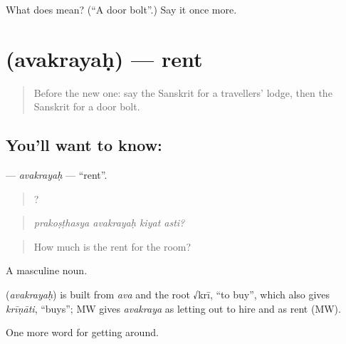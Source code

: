 \begin{tcolorbox}[breakable,colback=teal!4,colframe=teal!35!black,title={Before you move on}]
What does  mean? (\textquotedblleft{}A door bolt\textquotedblright{}.) Say it once more.
\end{tcolorbox}
\section[\texorpdfstring{\sk{अवक्रयः} (avakrayaḥ)}{अवक्रयः (avakrayaḥ)}]{ (avakrayaḥ) — rent}

\label{lesson:SA-C429-avakrayah}



\begin{quote}
Before the new one: say the Sanskrit for a travellers' lodge, then the Sanskrit for a door bolt.
\end{quote}

\subsection*{You'll want to know: }
\textbf{} — \emph{avakrayaḥ} — \textquotedblleft{}rent\textquotedblright{}.

\begin{quote}
   ?
\end{quote}

\begin{quote}
\emph{prakoṣṭhasya avakrayaḥ kiyat asti?}
\end{quote}

\begin{quote}
How much is the rent for the room?
\end{quote}

A masculine noun.

\begin{cousinweb}
\textbf{} (\emph{avakrayaḥ}) is built from \emph{ava} and the root √krī, \textquotedblleft{}to buy\textquotedblright{}, which also gives \emph{krīṇāti}, \textquotedblleft{}buys\textquotedblright{}; MW gives \emph{avakraya} as letting out to hire and as rent (MW).
\end{cousinweb}

\begin{grammarlens}[title={What you've built}]
One more word for getting around.
\end{grammarlens}

